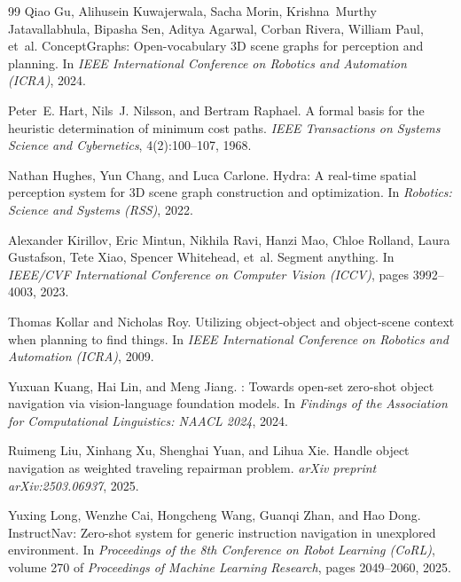 \documentclass[10pt]{article}
\begin{document}
\begin{thebibliography}{99}
Qiao Gu, Alihusein Kuwajerwala, Sacha Morin, Krishna~Murthy Jatavallabhula, Bipasha Sen, Aditya Agarwal, Corban Rivera, William Paul, et~al.
\newblock ConceptGraphs: Open-vocabulary 3D scene graphs for perception and planning.
\newblock In \emph{IEEE International Conference on Robotics and Automation (ICRA)}, 2024.

Peter~E. Hart, Nils~J. Nilsson, and Bertram Raphael.
\newblock A formal basis for the heuristic determination of minimum cost paths.
\newblock \emph{IEEE Transactions on Systems Science and Cybernetics}, 4(2):100--107, 1968.

Nathan Hughes, Yun Chang, and Luca Carlone.
\newblock Hydra: A real-time spatial perception system for 3D scene graph construction and optimization.
\newblock In \emph{Robotics: Science and Systems (RSS)}, 2022.

Alexander Kirillov, Eric Mintun, Nikhila Ravi, Hanzi Mao, Chloe Rolland, Laura Gustafson, Tete Xiao, Spencer Whitehead, et~al.
\newblock Segment anything.
\newblock In \emph{IEEE/CVF International Conference on Computer Vision (ICCV)}, pages 3992--4003, 2023.

Thomas Kollar and Nicholas Roy.
\newblock Utilizing object-object and object-scene context when planning to find things.
\newblock In \emph{IEEE International Conference on Robotics and Automation (ICRA)}, 2009.

Yuxuan Kuang, Hai Lin, and Meng Jiang.
: Towards open-set zero-shot object navigation via vision-language foundation models.
\newblock In \emph{Findings of the Association for Computational Linguistics: NAACL 2024}, 2024.

Ruimeng Liu, Xinhang Xu, Shenghai Yuan, and Lihua Xie.
\newblock Handle object navigation as weighted traveling repairman problem.
\newblock \emph{arXiv preprint arXiv:2503.06937}, 2025.

Yuxing Long, Wenzhe Cai, Hongcheng Wang, Guanqi Zhan, and Hao Dong.
\newblock InstructNav: Zero-shot system for generic instruction navigation in unexplored environment.
\newblock In \emph{Proceedings of the 8th Conference on Robot Learning (CoRL)}, volume 270 of \emph{Proceedings of Machine Learning Research}, pages 2049--2060, 2025.


\end{thebibliography}
\end{document}
